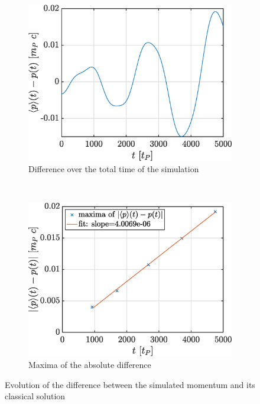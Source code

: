 \documentclass[a4paper,12pt,twoside]{article}
\begin{document}
\begin{figure}[h!]
 \begin{subfigure}[t]{0.45\textwidth}
 \includegraphics[width=\textwidth]{graphs/ii_diffp.eps}
  \caption{Difference over the total time of the simulation}
 \end{subfigure}
 ~
 \begin{subfigure}[t]{0.45\textwidth}
 \includegraphics[width=\textwidth]{graphs/ii_diffpsl.eps}
 \caption{Maxima of the absolute difference}
 \end{subfigure}
\caption{Evolution of the difference between the simulated momentum and its classical solution}
\label{fig:ii_diffp}
\end{figure}
\end{document}
